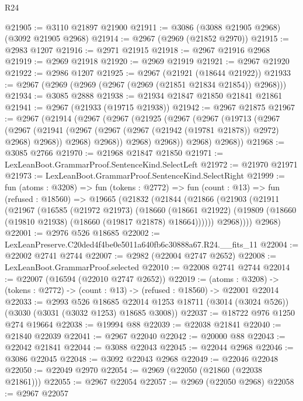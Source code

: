 \begin{lexlean}{R24}
\begin{coremodule}
@21905 := @3110 @21897 @21900
@21911 := @3086 (@3088 @21905 @2968) (@3092 @21905 @2968)
@21914 := @2967 (@2969 (@21852 @2970))
@21915 := @2983 @1207
@21916 := @2971 @21915
@21918 := @2967 @21916 @2968
@21919 := @2969 @21918
@21920 := @2969 @21919
@21921 := @2967 @21920
@21922 := @2986 @1207
@21925 := @2967 (@21921 (@18644 @21922))
@21933 := @2967 (@2969 (@2969 (@2967 (@2969 (@21851 @21834 @21854)) @2968)))
@21934 := @3085 @2888
@21938 := @21934 @21847 @21850 @21841 @21861
@21941 := @2967 (@21933 (@19715 @21938))
@21942 := @2967 @21875
@21967 := @2967
    (@21914
      (@2967
        (@2967
          (@21925
            (@2967
              (@2967
                (@19713
                  (@2967
                    (@2967
                      (@21941 (@2967 (@2967 (@2967 (@21942 (@19781 @21878)) @2972) @2968) @2968))
                      @2968)
                    @2968))
                @2968)
              @2968))
          @2968)
        @2968))
@21968 := @3085 @2766
@21970 := @21968 @21847 @21850
@21971 := LexLeanBoot.GrammarProof.SentenceKind.SelectLeft
@21972 := @21970 @21971
@21973 := LexLeanBoot.GrammarProof.SentenceKind.SelectRight
@21999 := fun (atoms : @3208) =>
  fun (tokens : @2772) =>
  fun (count : @13) =>
  fun (refused : @18560) =>
  @19665
    (@21832
      (@21844
        (@21866
          (@21903
            (@21911
              (@21967
                (@16585
                  (@21972 @21973)
                  (@18660
                    (@18661 @21922)
                    (@19809 (@18660 (@19810 @21938) (@18660 (@19817 @21878) @18664))))))
              @2968))))
      @2968)
@22001 := @2976 @526 @18685
@22002 := LexLeanPreserve.C20ded4f4be0e5011a640fb6c30888a67.R24.__fits_11
@22004 := @22002 @2741 @2744
@22007 := @2982 (@22004 @2747 @2652)
@22008 := LexLeanBoot.GrammarProof.selected
@22010 := @22008 @2741 @2744
@22014 := @22007 (@16594 (@22010 @2747 @2652))
@22019 := (atoms : @3208) ->
  (tokens : @2772) -> (count : @13) -> (refused : @18560) -> @22001 @22014
@22033 := @2993
    @526
    @18685
    @22014
    @1253
    @18711
    (@3014 (@3024 @526))
    (@3030 (@3031 (@3032 @1253) @18685 @3008))
@22037 := @18722 @976 @1250 @274 @19664
@22038 := @19994 @88
@22039 := @22038 @21841
@22040 := @21840 @22039
@22041 := @2967 @22040
@22042 := @20000 @88
@22043 := @22042 @21841
@22044 := @3088 @22043
@22045 := @22044 @2968
@22046 := @3086 @22045
@22048 := @3092 @22043 @2968
@22049 := @22046 @22048
@22050 := @22049 @2970
@22054 := @2969 (@22050 (@21860 (@22038 @21861)))
@22055 := @2967 @22054
@22057 := @2969 (@22050 @2968)
@22058 := @2967 @22057

\end{coremodule}
\end{lexlean}
